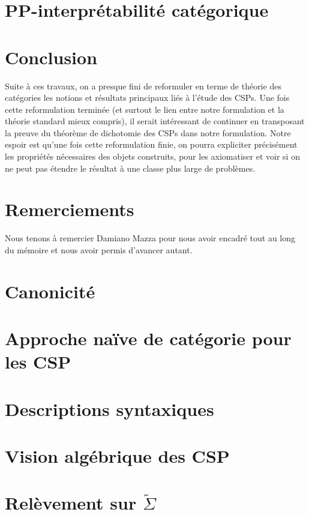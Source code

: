 \documentclass[12pt]{article}
\newcommand{\tsigma}{\widetilde{\Sigma}}
\begin{document}
\section{PP-interprétabilité catégorique}\label{secPP}


\section{Conclusion}

Suite à ces travaux, on a presque fini de reformuler en terme de théorie des
catégories les notions et résultats principaux liés à l'étude des CSPs. Une
fois cette reformulation terminée (et surtout le lien entre notre formulation
et la théorie standard mieux compris), il serait intéressant de continuer en
transposant la preuve du théorème de dichotomie des CSPs dans notre
formulation. Notre espoir est qu'une fois cette reformulation finie, on pourra
expliciter précisément les propriétés nécessaires des objets construits, pour
les axiomatiser et voir si on ne peut pas étendre le résultat à une classe plus
large de problèmes.

\section*{Remerciements}

Nous tenons à remercier Damiano Mazza pour nous avoir encadré tout au long du
mémoire et nous avoir permis d'avancer autant.


\appendix
\newpage
\section{Canonicité}\label{appCanon}


\newpage
\section{Approche naïve de catégorie pour les CSP}\label{appNaif}


\newpage
\section{Descriptions syntaxiques}\label{appSyn}


\newpage
\section{Vision algébrique des CSP}\label{appClones}


\newpage
\section{Relèvement sur $\tsigma$}

\end{document}
